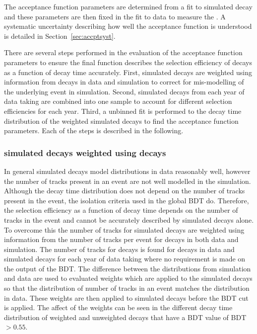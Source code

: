 The acceptance function parameters are determined from a fit to simulated decay and these parameters are then fixed in the fit to data to measure the \el. A systematic uncertainty describing how well the acceptance function is understood is detailed in Section~\ref{sec:accptsyst}.

There are several steps performed in the evaluation of the acceptance function parameters to ensure the final function describes the selection efficiency of \bsmumu decays as a function of decay time accurately.
First, simulated \bsmumu decays are weighted using information from \bdkpi decays in data and simulation to correct for mis-modelling of the underlying event in simulation. Second, simulated \bsmumu decays from each year of data taking are combined into one sample to account for different selection efficiencies for each year. Third, a unbinned \ml fit is performed to the decay time distribution of the weighted simulated decays to find the acceptance function parameters. Each of the steps is described in the following.


\subsubsection*{\boldmath{\bsmumu} simulated decays weighted using \boldmath{\bdkpi} decays}


In general simulated decays model distributions in data reasonably well, however the number of tracks present in an event are not well modelled in the simulation. %
Although the \bsmumu decay time distribution does not depend on the number of tracks present in the event, the isolation criteria used in the global BDT do. Therefore, the selection efficiency as a function of decay time depends on the number of tracks in the event and cannot be accurately described by simulated decays alone. To overcome this the number of tracks for simulated \bsmumu decays are weighted using information from the number of tracks per event for \bdkpi decays in both data and simulation. The number of tracks for \bdkpi decays is found for decays in data and simulated decays for each year of data taking where no requirement is made on the output of the BDT. The difference between the distributions from simulation and data are used to evaluated weights which are applied to the simulated decays so that the distribution of number of tracks in an event matches the distribution in data. These weights are then applied to simulated \bsmumu decays before the BDT cut is applied. The affect of the weights can be seen in the different decay time distribution of weighted and unweighted decays that have a BDT value of BDT $>0.55$.

